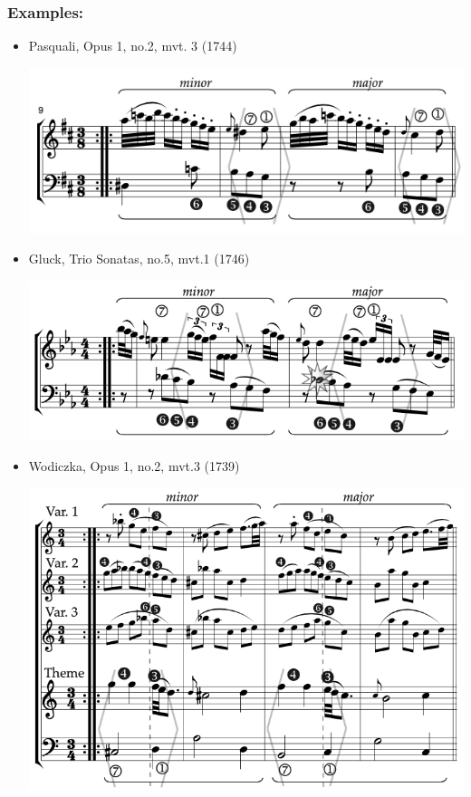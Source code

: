 \documentclass[11pt, openany]{article}
\begin{document}
\subsubsection{Examples:}
\begin{itemize}
\item Pasquali, Opus 1, no.2, mvt. 3 (1744)
\begin{center}
\includegraphics[scale=0.5]{pasquali1.png}
\end{center}
\item Gluck, Trio Sonatas, no.5, mvt.1 (1746)
\begin{center}
\includegraphics[scale=0.5]{gluck5.png}
\end{center}
\item Wodiczka, Opus 1, no.2, mvt.3 (1739)
\begin{center}
\includegraphics[scale=0.5]{wodiczka1.png}
\end{center}
\end{itemize}
\end{document}
